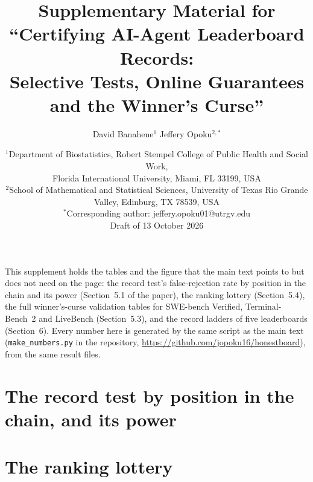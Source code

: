 \documentclass[11pt]{article}
\title{Supplementary Material for\\``Certifying AI-Agent Leaderboard Records:\\Selective Tests, Online Guarantees and the Winner's Curse''}
\author{David Banahene$^{1}$ \quad Jeffery Opoku$^{2,*}$}
\date{\small
$^1$Department of Biostatistics, Robert Stempel College of Public Health and Social Work,\\
Florida International University, Miami, FL 33199, USA\\
$^2$School of Mathematical and Statistical Sciences, University of Texas Rio Grande Valley, Edinburg, TX 78539, USA\\[3pt]
$^*$Corresponding author: jeffery.opoku01@utrgv.edu\\[8pt]
Draft of 13 October 2026}
\begin{document}
\maketitle

This supplement holds the tables and the figure that the main text points to but does not need on the page: the record test's false-rejection rate by position in the chain and its power (Section~5.1 of the paper), the ranking lottery (Section~5.4), the full winner's-curse validation tables for SWE-bench Verified, Terminal-Bench~2 and LiveBench (Section~5.3), and the record ladders of five leaderboards (Section~6).
Every number here is generated by the same script as the main text (\texttt{make\_numbers.py} in the repository, \url{https://github.com/jopoku16/honestboard}), from the same result files.

\section{The record test by position in the chain, and its power}
\begin{table}[H]
\centering\small
\resizebox{\textwidth}{!}{}
\caption{Global null: how often the test wrongly rejects, by the step's position in the record chain (fitted Verified model). The first step compares against the first submission, which is only mildly lucky; later steps compare against the best system so far.}
\label{tab:position}
\end{table}

\begin{table}[H]
\centering\small
\resizebox{\textwidth}{!}{}
\caption{How often the selective paired test catches a true gap of 1, 2, 3 and 5 points, and a gap equal to the minimum detectable difference given by the formula in Section~3 of the paper. Fitted Verified model, baseline score \NumSimBase\%.}
\label{tab:power}
\end{table}

\section{The ranking lottery}
\begin{table}[H]
\centering\small
\resizebox{0.9\textwidth}{!}{}
\caption{Known-truth simulation of ranking on SWE-bench Verified: how often the observed winner really is one of the best systems, and whether the set of possible best systems contains a truly best system when the winner is not one.}
\label{tab:lottery}
\end{table}
\end{document}
